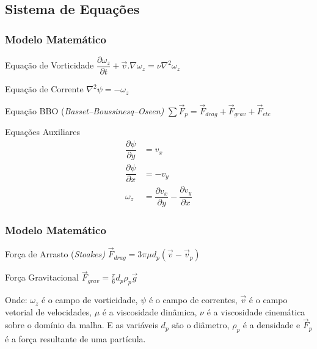 \documentclass{beamer}
\newcommand{\partfrac}[3] %
{
  \ensuremath{\dfrac{\partial{#2}}{\partial{#3}}}
}
\begin{document}
\subsection{Sistema de Equações}
\begin{frame}
  \frametitle{Modelo Matemático}
  \begin{minipage}{.48\textwidth}
    \begin{block}{Equação de Vorticidade}
      \centering
      $\partfrac2{\omega_z}{t} + \vec{v}.\nabla\omega_z = \nu \nabla^2 \omega_z$
    \end{block}

    \begin{block}{Equação de Corrente}
      \centering
      $\nabla^2 \psi = -\omega_z$
    \end{block}
    
    \begin{block}{Equação BBO (\it{Basset–Boussinesq–Oseen})}
      \centering
      $\sum \vec{F}_p = \vec{F}_{drag} + \vec{F}_{grav} + \vec{F}_{etc}$
    \end{block}
  \end{minipage}
  \hfill
  \begin{minipage}{.48\textwidth}
    \begin{block}{Equações Auxiliares}
      \vspace*{-\baselineskip}\setlength\belowdisplayshortskip{0pt} %
      \centering
      \begin{align*}
	\partfrac2{\psi}{y} &= v_x \\
	\partfrac2{\psi}{x} &= -v_y \\
	\omega_z &= \partfrac2{v_x}{y} - \partfrac2{v_y}{x} 
      \end{align*}
    \end{block}
  \end{minipage}
  
\end{frame}

\begin{frame}
  \frametitle{Modelo Matemático}
  \begin{block}{Força de Arrasto (\it{Stoakes})}
    \centering
    $\vec{F}_{drag} = 3 \pi \mu d_p (\vec{v} - \vec{v}_p)$
  \end{block}
  \begin{block}{Força Gravitacional}
    \centering
    $\vec{F}_{grav} = \tfrac{\pi}{6} d_p \rho_p \vec{g}$
  \end{block}
  
  Onde: $\omega_z$ é o campo de vorticidade, $\psi$ é o campo de correntes, $\vec{v}$ é o campo vetorial de velocidades, 
  $\mu$ é a viscosidade dinâmica, $\nu$ é a viscosidade cinemática sobre o domínio da malha.
  E as variáveis $d_p$ são o diâmetro, $\rho_p$ é a densidade e $\vec{F}_p$ é a força resultante de uma partícula.
\end{frame}
\end{document}
